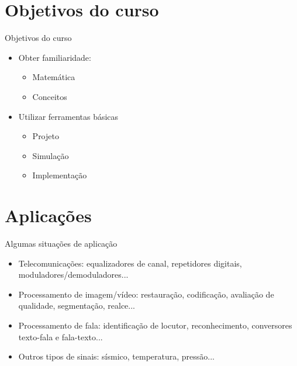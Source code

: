 \documentclass[
size=17pt,
paper=smartboard,
mode=present,
display=slidesnotes,
style=sailor,
nopagebreaks,
blackslide,
fleqn]{powerdot}
\begin{document}
   \section[slide=false]{Objetivos do curso}
      \begin{slide}[toc=]{Objetivos do curso}
         \begin{itemize}
            \item Obter familiaridade:
            \begin{itemize}
               \item Matemática
               \item Conceitos
            \end{itemize}
            \item Utilizar ferramentas básicas
            \begin{itemize}
               \item Projeto
               \item Simulação
               \item Implementação
            \end{itemize}
            
         \end{itemize}
      \end{slide}

   \section[slide=false]{Aplicações}
      \begin{slide}[toc=]{Algumas situações de aplicação}
         \begin{itemize}
            \item Telecomunicações: equalizadores de canal, repetidores digitais, moduladores/demoduladores...
            \item Processamento de imagem/vídeo: restauração, codificação, avaliação de qualidade, segmentação, realce...
            \item Processamento de fala: identificação de locutor, reconhecimento, conversores texto-fala e fala-texto...
            \item Outros tipos de sinais: sísmico, temperatura, pressão...
         \end{itemize}
      \end{slide}


  
\end{document}
